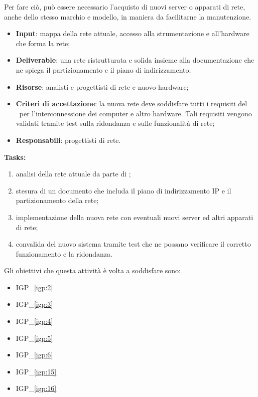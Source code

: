 		Per fare ciò, può essere necessario l'acquisto di nuovi server o apparati di rete, anche dello stesso marchio e modello, in maniera da facilitarne la manutenzione.
	
		\begin{itemize}[noitemsep]
			\renewcommand\labelitemi{--}
			\item \textbf{Input}: mappa della rete attuale, accesso alla strumentazione e all'hardware che forma la rete;
			\item \textbf{Deliverable}: una rete ristrutturata e solida insieme alla documentazione che ne spiega il partizionamento e il piano di indirizzamento; 
			\item \textbf{Risorse}: analisti e progettisti di rete e nuovo hardware;
			\item \textbf{Criteri di accettazione}: la nuova rete deve soddisfare tutti i requisiti del \proponente~per l'interconnessione dei computer e altro hardware. Tali requisiti vengono validati tramite test sulla ridondanza e sulle funzionalità di rete;
			\item \textbf{Responsabili}: progettisti di rete.
		\end{itemize}
		
		\textbf{Tasks:}
		\begin{enumerate}[noitemsep]
			\item analisi della rete attuale da parte di \azienda;
			\item stesura di un documento che includa il piano di indirizzamento IP e il partizionamento della rete;
			\item implementazione della nuova rete con eventuali nuovi server ed altri apparati di rete;
			\item convalida del nuovo sistema tramite test che ne possano verificare il corretto funzionamento e la ridondanza.
		\end{enumerate}

		Gli obiettivi che questa attività è volta a soddisfare sono:
		\begin{itemize}[noitemsep]
			\renewcommand\labelitemi{--}
			\item {\color{pantone}IGP\_\ref{igp:2}}
			\item {\color{pantone}IGP\_\ref{igp:3}}
			\item {\color{pantone}IGP\_\ref{igp:4}}
			\item {\color{pantone}IGP\_\ref{igp:5}}
			\item {\color{pantone}IGP\_\ref{igp:6}}
			\item {\color{pantone}IGP\_\ref{igp:15}}
			\item {\color{pantone}IGP\_\ref{igp:16}}
		\end{itemize}
	
